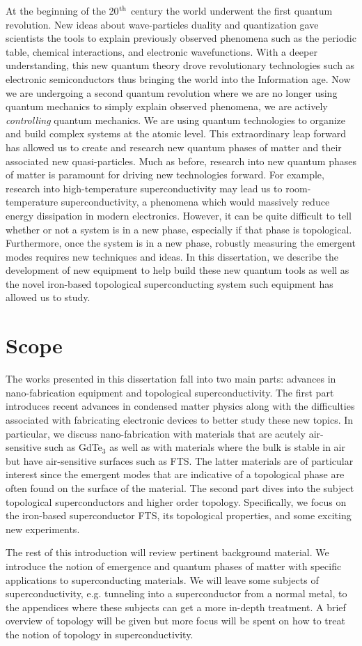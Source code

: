 At the beginning of the 20$\textsuperscript{th}$ century the world underwent the first quantum revolution. New ideas about wave-particles duality and quantization gave scientists the tools to explain previously observed phenomena such as the periodic table, chemical interactions, and electronic wavefunctions. With a deeper understanding, this new quantum theory drove revolutionary technologies such as electronic semiconductors thus bringing the world into the Information age. Now we are undergoing a second quantum revolution where we are no longer using quantum mechanics to simply explain observed phenomena, we are actively \textit{controlling} quantum mechanics.\cite{Dowling2003} We are using quantum technologies to organize and build complex systems at the atomic level. This extraordinary leap forward has allowed us to create and research new quantum phases of matter and their associated new quasi-particles. Much as before, research into new quantum phases of matter is paramount for driving new technologies forward. For example, research into high-temperature superconductivity may lead us to room-temperature superconductivity, a phenomena which would massively reduce energy dissipation in modern electronics. However, it can be quite difficult to tell whether or not a system is in a new phase, especially if that phase is topological. Furthermore, once the system is in a new phase, robustly measuring the emergent modes requires new techniques and ideas. In this dissertation, we describe the development of new equipment to help build these new quantum tools as well as the novel iron-based topological superconducting system such equipment has allowed us to study.
\section{Scope}
The works presented in this dissertation fall into two main parts: advances in nano-fabrication equipment and topological superconductivity. The first part introduces recent advances in condensed matter physics along with the difficulties associated with fabricating electronic devices to better study these new topics. In particular, we discuss nano-fabrication with materials that are acutely air-sensitive such as GdTe$_{3}$ as well as with materials where the bulk is stable in air but have air-sensitive surfaces such as \ac{FTS}. The latter materials are of particular interest since the emergent modes that are indicative of a topological phase are often found on the surface of the material. The second part dives into the subject topological superconductors and higher order topology. Specifically, we focus on the iron-based superconductor \acl{FTS}, its topological properties, and some exciting new experiments.\par
The rest of this introduction will review pertinent background material. We introduce the notion of emergence and quantum phases of matter with specific applications to superconducting materials. We will leave some subjects of superconductivity, e.g. tunneling into a superconductor from a normal metal, to the appendices where these subjects can get a more in-depth treatment. A brief overview of topology will be given but more focus will be spent on how to treat the notion of topology in superconductivity.
